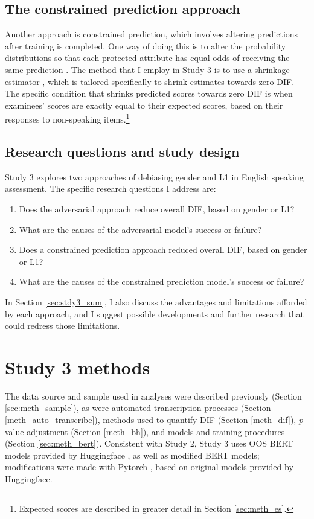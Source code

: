 \documentclass [PhD] {uclathes}
\begin{document}
\subsection{The constrained prediction approach}

Another approach is constrained prediction, which involves altering predictions after training is completed. One way of doing this is to alter the probability distributions so that each protected attribute has equal odds of receiving the same prediction \citep[e.g.][]{yatskar2016situation}. The method that I employ in Study 3 is to use a shrinkage estimator \citep{fourdrinier2018shrinkage}, which is tailored specifically to shrink estimates towards zero DIF. The specific condition that shrinks predicted scores towards zero DIF is when examinees’ scores are exactly equal to their expected scores, based on their responses to non-speaking items.\footnote{Expected scores are described in greater detail in Section \ref{sec:meth_es}.}

\subsection{Research questions and study design}

Study 3 explores two approaches of debiasing gender and L1 in English speaking assessment. The specific research questions I address are:

\begin{enumerate}
	\item Does the adversarial approach reduce overall DIF, based on gender or L1?
	\item What are the causes of the adversarial model’s success or failure?
	\item Does a constrained prediction approach reduced overall DIF, based on gender or L1?
	\item What are the causes of the constrained prediction model’s success or failure?
\end{enumerate}

In Section \ref{sec:stdy3_sum}, I also discuss the advantages and limitations afforded by each approach, and I suggest possible developments and further research that could redress those limitations. 

\section{Study 3 methods}

The data source and sample used in analyses were described previously (Section \ref{sec:meth_sample}), as were automated transcription processes (Section \ref{meth_auto_transcribe}), methods used to quantify DIF (Section \ref{meth_dif}), $p$-value adjustment (Section \ref{meth_bh}), and models and training procedures (Section \ref{sec:meth_bert}). Consistent with Study 2, Study 3 uses OOS BERT models provided by Huggingface \citep{wolf_transformers_2020}, as well as modified BERT models; modifications were made with Pytorch \citep{paszke_pytorch_2019}, based on original models provided by Huggingface.
\end{document}
